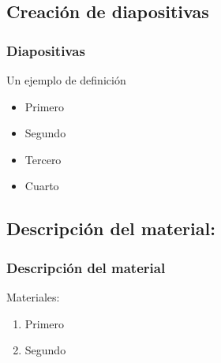 \documentclass{beamer}
\begin{document}
\subsection{Creación de diapositivas}

\begin{frame}
\frametitle{Diapositivas}

\begin{definition}
  Un ejemplo de definición
\end{definition}

\begin{example}
  \begin{itemize}
    \item <1-> Primero \pause
    \item <2-> Segundo \pause
    \item <3-> Tercero \pause
    \item <4-> Cuarto  
  \end{itemize}
\end{example}

\end{frame}

\subsection{Descripción del material:}
\begin{frame}
\frametitle{Descripción del material}

\begin{block}{Materiales:}
  \begin{enumerate}
    \item
      Primero
      \pause

    \item
      Segundo 

  \end{enumerate}
\end{block}

\end{frame}
\end{document}
